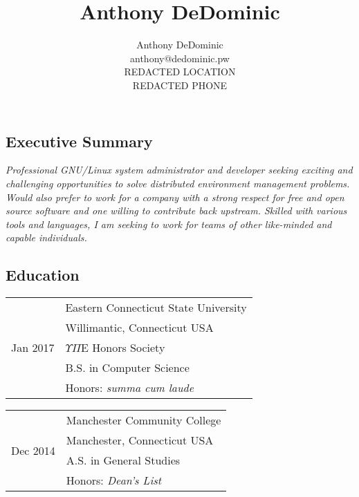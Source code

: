 \documentclass[letterpaper,]{article}
\author{Anthony DeDominic\\anthony@dedominic.pw\\REDACTED LOCATION\\REDACTED PHONE}
\title{Anthony DeDominic}
\begin{document}

\subsection{Executive Summary}\label{about}

\emph{Professional GNU/Linux system administrator and developer seeking
exciting and challenging opportunities to solve distributed environment
management problems. Would also prefer to work for a company with
a strong respect for free and open source software and one willing to
contribute back upstream. Skilled with various tools and languages, 
I am seeking to work for teams of other like-minded and capable individuals.}

\subsection{Education}\label{education}

\begin{table}[H]
    \begin{minipage}{0.5\linewidth}
    \centering
    \begin{tabular}{r|l}
        \multirow{5}{*}{Jan 2017}
        & Eastern Connecticut State University \\
        & Willimantic, Connecticut USA \\
        & $\Upsilon \Pi \mathrm{E}$ Honors Society \\
        & B.S. in Computer Science \\
        & Honors: \emph{summa cum laude} \\
    \end{tabular}
    \end{minipage}
    \begin{minipage}{0.5\linewidth}
    \centering
    \begin{tabular}{r|l}
        \multirow{4}{*}{Dec 2014} 
        & Manchester Community College \\
        & Manchester, Connecticut USA \\
        & A.S. in General Studies \\
        & Honors: \emph{Dean's List} \\
    \end{tabular}
    \end{minipage}
\end{table}
\end{document}
